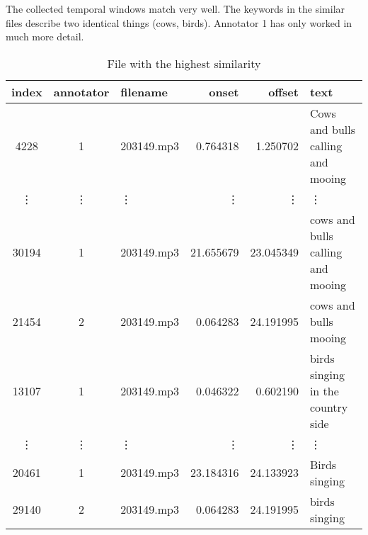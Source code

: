 The collected temporal windows match very well. The keywords in the similar files describe two identical things (cows, birds).
Annotator 1 has only worked in much more detail.

\begin{table}[h]
  \caption{File with the highest similarity}
  \label{tab:highest similarity}
  \centering
  \begin{tabular}{cclrrp{6cm}}
    \toprule
    index & annotator & filename & onset & offset & text \\
    \midrule
    4228 & 1 & 203149.mp3 & 0.764318 & 1.250702 & Cows and bulls calling and mooing \\
    \vdots & \vdots & \vdots & \vdots & \vdots & \vdots \\
    30194 & 1 & 203149.mp3 & 21.655679 & 23.045349 & cows and bulls calling and mooing \\
    21454 & 2 & 203149.mp3 & 0.064283 & 24.191995 & cows and bulls mooing \\
    13107 & 1 & 203149.mp3 & 0.046322 & 0.602190 & birds singing in the country side \\
    \vdots & \vdots & \vdots & \vdots & \vdots & \vdots \\
    20461 & 1 & 203149.mp3 & 23.184316 & 24.133923 & Birds singing \\
    29140 & 2 & 203149.mp3 & 0.064283 & 24.191995 & birds singing \\
    \bottomrule
  \end{tabular}
\end{table}


